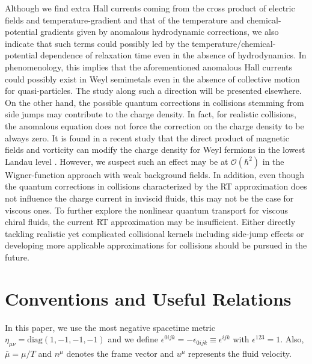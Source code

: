 \documentclass[aps,prd,showkeys,preprint,amsmath,amssymb,nofootinbib]{revtex4-1}
\begin{document}
Although we find extra Hall currents coming from the cross product of electric fields and temperature-gradient and that of the temperature and chemical-potential gradients given by anomalous hydrodynamic corrections, we also indicate that such terms could possibly led by the temperature/chemical-potential dependence of relaxation time even in the absence of hydrodynamics. In phenomenology, this implies that the aforementioned anomalous Hall currents could possibly exist in Weyl semimetals even in the absence of collective motion for quasi-particles. The study along such a direction will be presented elsewhere. On the other hand, the possible quantum corrections in collisions stemming from side jumps may contribute to the charge density. In fact, for realistic collisions, the anomalous equation does not force the correction on the charge density to be always zero. It is found in a recent study that the direct product of magnetic fields and vorticity can modify the charge density for Weyl fermions in the lowest Landau level \cite{Hattori:2016njk}. However, we suspect such an effect may be at $\mathcal{O}(\hbar^2)$ in the Wigner-function approach with weak background fields. In addition, even though the quantum corrections in collisions characterized by the RT approximation does not influence the charge current in inviscid fluids, this may not be the case for viscous ones. To further explore the nonlinear quantum transport for viscous chiral fluids, the current RT approximation may be insufficient. Either directly tackling realistic yet complicated collisional kernels including side-jump effects or developing more applicable approximations for collisions should be pursued in the future.           
 
\appendix


\section{Conventions and Useful Relations \label{convention}} 
In this paper, we use the most negative spacetime metric $\eta_{\mu\nu}=\text{diag}(1,-1,-1,-1)$ and we define $\epsilon^{0ijk}=-\epsilon_{0ijk}\equiv\epsilon^{ijk}$ with $\epsilon^{123}=1$.
Also, $\bar{\mu}=\mu/T$ and $n^{\mu}$ denotes the frame vector and $u^{\mu}$ represents the fluid velocity.
\end{document}
